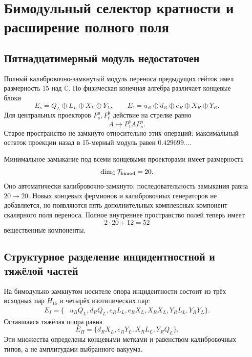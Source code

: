 \chapter{Бимодульный селектор кратности и расширение полного поля}
\label{ch:v8-bimodule-multiplicity-separator-gate}

\section{Пятнадцатимерный модуль недостаточен}

Полный калибровочно-замкнутый модуль переноса предыдущих гейтов имел размерность
15 над $\mathbb C$. Но физическая конечная алгебра различает концевые блоки
\begin{equation}
 E_s=Q_L\oplus L_L\oplus X_L\oplus Y_L,
 \qquad
 E_t=u_R\oplus d_R\oplus e_R\oplus X_R\oplus Y_R.
 \label{eq:v8-endpoint-bimodule-blocks}
\end{equation}
Для центральных проекторов $P_s^a,P_t^b$ действие на стрелке равно
\begin{equation}
 A\longmapsto P_t^bAP_s^a.
 \label{eq:v8-endpoint-block-action}
\end{equation}
Старое пространство не замкнуто относительно этих операций: максимальный
остаток проекции назад в 15-мерный модуль равен $0.429699\ldots$.

Минимальное замыкание под всеми концевыми проекторами имеет размерность
\begin{equation}
 \dim_{\mathbb C}\mathcal T_{\rm bimod}=20.
 \label{eq:v8-bimodule-transfer-dimension}
\end{equation}
Оно автоматически калибровочно-замкнуто: последовательность замыкания равна
$20\to20$. Новых концевых фермионов и калибровочных генераторов не добавляется, но
появляются пять дополнительных комплексных компонент скалярного поля переноса.
Полное внутреннее пространство полей теперь имеет
\begin{equation}
 2\cdot20+12=52
 \label{eq:v8-bimodule-full-field-real-dimension}
\end{equation}
вещественные компоненты.

\section{Структурное разделение инцидентностной и тяжёлой частей}

На бимодульно замкнутом носителе опора инцидентности состоит из трёх
исходных пар $H_{15}$ и четырёх изотипических пар:
\begin{align}
 E_I=\{&u_RQ_L,d_RQ_L,e_RL_L,
 e_RX_L,X_RX_L,Y_RL_L,Y_RY_L\}.
 \label{eq:v8-bimodule-incidence-support}
\end{align}
Оставшаяся тяжёлая опора равна
\begin{equation}
 E_H=\{d_RX_L,e_RY_L,X_RL_L,Y_RQ_L\}.
 \label{eq:v8-bimodule-heavy-support}
\end{equation}
Эти множества определены концевыми метками и равенством калибровочных типов, а не
амплитудами выбранного вакуума.

